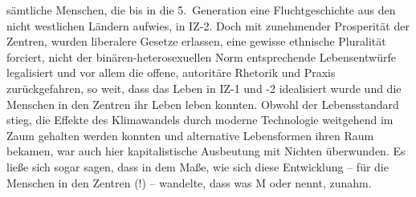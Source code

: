 sämtliche Menschen, die bis in die 5.~Generation eine Fluchtgeschichte aus den
nicht westlichen Ländern aufwies, in IZ-2. 
Doch mit zunehmender Prosperität der Zentren, wurden liberalere Gesetze
erlassen, eine gewisse ethnische Pluralität forciert, nicht der
binären-heterosexuellen Norm entsprechende Lebensentwürfe legalisiert und vor
allem die offene, autoritäre Rhetorik und Praxis zurückgefahren, so weit, dass
das Leben in IZ-1 und -2 idealisiert wurde und die Menschen in den Zentren
 ihr Leben leben konnten. 
Obwohl der Lebensstandard stieg, die Effekte des Klimawandels durch moderne
Technologie weitgehend im Zaum gehalten werden konnten und alternative
Lebensformen ihren Raum bekamen, war auch hier kapitalistische Ausbeutung mit
Nichten überwunden. 
Es ließe sich sogar sagen, dass in dem Maße, wie sich diese Entwicklung -- für
die Menschen in den Zentren (!) --  wandelte, dass was M
 oder  nennt, zunahm. 

